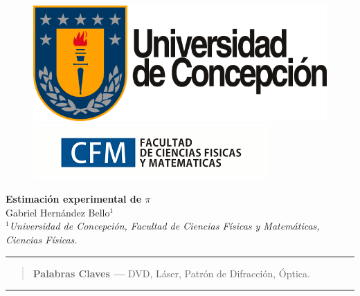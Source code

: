 \documentclass[10pt,a4paper]{article}
\author{Gabriel Hernandez Bello}
\begin{document}
	
	\begin{figure}[H]
		\raggedright
		\includegraphics[scale=0.2]{../Altura-Campanil/IMG/logo_udec.png} \hfill \includegraphics[scale=0.5]{../Altura-Campanil/IMG/cfm_logo.png}
	\end{figure}

	\vspace{6mm}
	\begin{center}
		{\Large \textbf{Estimación experimental de \textbf{$\pi$}}}\\
		\vspace{2mm}
		{\large Gabriel Hernández Bello$^{1}$}\\
		\vspace{6.5mm}
		$^1$\textit{Universidad de Concepción, Facultad de Ciencias Físicas y Matemáticas, Ciencias Físicas. }\\
	\end{center}

	\begin{center}
		\textcolor{pinegreen}{\rule{150mm}{0.8mm}}
	\end{center}

	\begin{abstract}

		\textbf{Palabras Claves ---}  DVD, Láser, Patrón de Difracción, Óptica.
	\end{abstract}
	
	\begin{center}
		\textcolor{pinegreen}{\rule{150mm}{0.8mm}}
	\end{center}
	
\end{document}
